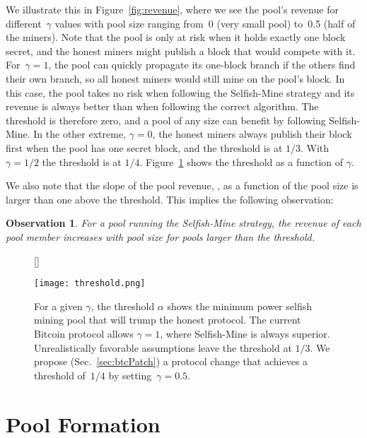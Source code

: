 \documentclass[letterpaper]{llncs}
\newtheorem{observation}{Observation}
\begin{document}
We illustrate this in Figure~\ref{fig:revenue}, where we see the pool's revenue for different~$\gamma$ values with pool size ranging from~0 (very small pool) to~0.5 (half of the miners). 
Note that the pool is only at risk when it holds exactly one block secret, and the honest miners might publish a block that would compete with it. 
For~$\gamma = 1$, the pool can quickly propagate its one-block branch if the others find their own branch, so all honest miners would still mine on the pool's block. In this case, the pool takes no risk when following the Selfish-Mine strategy and its revenue is always better than when following the correct algorithm. The threshold is therefore zero, and a pool of any size can benefit by following Selfish-Mine. In the other extreme, $\gamma = 0$, the honest miners always publish their block first when the pool has one secret block, and the threshold is at $1/3$. With $\gamma = 1/2$ the threshold is at $1/4$. Figure~\ref{fig:threshold} shows the threshold as a function of $\gamma$. 

We also note that the slope of the pool revenue, \RPool, as a function of the pool size is larger than one above the threshold. This implies the following observation: 

\begin{observation} \label{obs:increasing}
For a pool running the Selfish-Mine strategy, the revenue of each pool member increases with pool size for pools larger than the threshold. 
\end{observation}



\begin{figure}[t]
[\FBwidth]{
\caption{
For a given $\gamma$, the threshold $\alpha$ shows the minimum power selfish mining pool that will trump the honest protocol. 
The current Bitcoin protocol allows $\gamma=1$, where Selfish-Mine is always superior. 
Unrealistically favorable assumptions leave the threshold at $1/3$. 
We propose (Sec.~\ref{sec:btcPatch}) a protocol change that achieves a threshold of~$1/4$ by setting~$\gamma=0.5$. 
}
\label{fig:threshold}
}{
\texttt{[image: threshold.png]}
}
\end{figure}



    \section{Pool Formation} \label{sec:poolFormation} 
\end{document}
